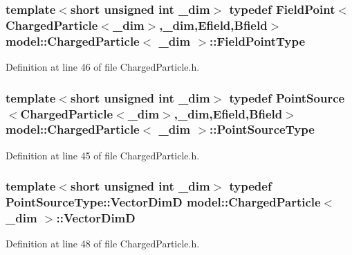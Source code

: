 \subsubsection[{Field\+Point\+Type}]{\setlength{\rightskip}{0pt plus 5cm}template$<$short unsigned int \+\_\+dim$>$ typedef {\bf Field\+Point}$<${\bf Charged\+Particle}$<$\+\_\+dim$>$,\+\_\+dim,{\bf Efield},{\bf Bfield}$>$ {\bf model\+::\+Charged\+Particle}$<$ \+\_\+dim $>$\+::{\bf Field\+Point\+Type}}\label{classmodel_1_1_charged_particle_a0a40d2605cb1ace9a6277c5b61cb5733}


Definition at line 46 of file Charged\+Particle.\+h.

\hypertarget{classmodel_1_1_charged_particle_ab17dac856176be5f7d8394283d087783}{}
\subsubsection[{Point\+Source\+Type}]{\setlength{\rightskip}{0pt plus 5cm}template$<$short unsigned int \+\_\+dim$>$ typedef {\bf Point\+Source}$<${\bf Charged\+Particle}$<$\+\_\+dim$>$,\+\_\+dim,{\bf Efield},{\bf Bfield}$>$ {\bf model\+::\+Charged\+Particle}$<$ \+\_\+dim $>$\+::{\bf Point\+Source\+Type}}\label{classmodel_1_1_charged_particle_ab17dac856176be5f7d8394283d087783}


Definition at line 45 of file Charged\+Particle.\+h.

\hypertarget{classmodel_1_1_charged_particle_a31a77e0315958d087309087da65b422d}{}
\subsubsection[{Vector\+Dim\+D}]{\setlength{\rightskip}{0pt plus 5cm}template$<$short unsigned int \+\_\+dim$>$ typedef Point\+Source\+Type\+::\+Vector\+Dim\+D {\bf model\+::\+Charged\+Particle}$<$ \+\_\+dim $>$\+::{\bf Vector\+Dim\+D}}\label{classmodel_1_1_charged_particle_a31a77e0315958d087309087da65b422d}


Definition at line 48 of file Charged\+Particle.\+h.



